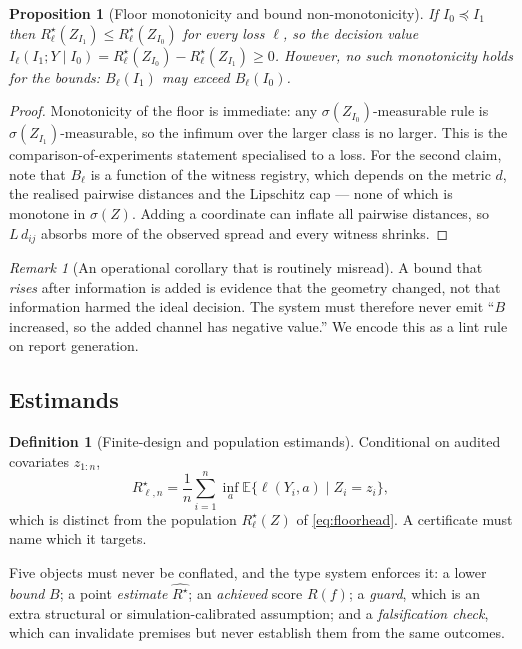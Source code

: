 \documentclass[11pt,a4paper]{article}
\newtheorem{proposition}[theorem]{Proposition}
\theoremstyle{definition}
\newtheorem{definition}[theorem]{Definition}
\theoremstyle{remark}
\newtheorem{remark}[theorem]{Remark}
\newcommand{\risk}{R^{\star}}
\newcommand{\E}{\mathbb{E}}
\begin{document}
\begin{proposition}[Floor monotonicity and bound non-monotonicity]\label{prop:mono}
If $I_0\preceq I_1$ then $\risk_\ell(Z_{I_1})\le\risk_\ell(Z_{I_0})$ for every loss $\ell$, so the decision value
$I_\ell(I_1;Y\mid I_0)=\risk_\ell(Z_{I_0})-\risk_\ell(Z_{I_1})\ge0$.
However, no such monotonicity holds for the \emph{bounds}: $B_\ell(I_1)$ may exceed $B_\ell(I_0)$.
\end{proposition}

\begin{proof}
Monotonicity of the floor is immediate: any $\sigma(Z_{I_0})$-measurable rule is $\sigma(Z_{I_1})$-measurable, so the infimum over the larger class is no larger. This is the comparison-of-experiments statement specialised to a loss. For the second claim, note that $B_\ell$ is a function of the witness registry, which depends on the metric $d$, the realised pairwise distances and the Lipschitz cap --- none of which is monotone in $\sigma(Z)$. Adding a coordinate can inflate all pairwise distances, so $L\,d_{ij}$ absorbs more of the observed spread and every witness shrinks. \end{proof}

\begin{remark}[An operational corollary that is routinely misread]
A bound that \emph{rises} after information is added is evidence that the geometry changed, not that information harmed the ideal decision. The system must therefore never emit ``$B$ increased, so the added channel has negative value.'' We encode this as a lint rule on report generation.
\end{remark}

\subsection{Estimands}

\begin{definition}[Finite-design and population estimands]
Conditional on audited covariates $z_{1:n}$,
\[
\risk_{\ell,n}=\frac1n\sum_{i=1}^n \inf_a\E\{\ell(Y_i,a)\mid Z_i=z_i\},
\]
which is distinct from the population $\risk_\ell(Z)$ of \eqref{eq:floorhead}. A certificate must name which it targets.
\end{definition}

Five objects must never be conflated, and the type system enforces it: a lower \emph{bound} $B$; a point \emph{estimate} $\widehat{\risk}$; an \emph{achieved} score $R(f)$; a \emph{guard}, which is an extra structural or simulation-calibrated assumption; and a \emph{falsification check}, which can invalidate premises but never establish them from the same outcomes.
\end{document}
